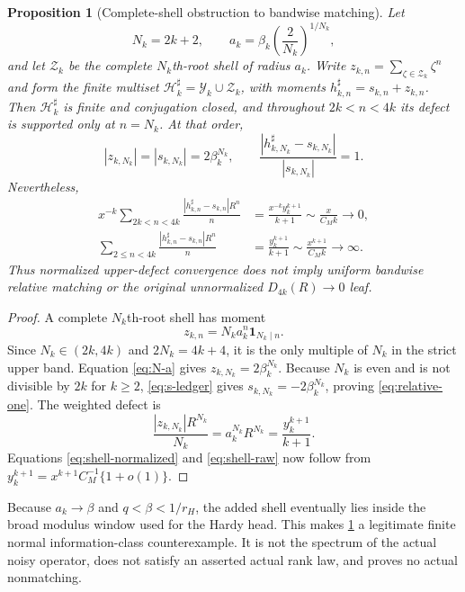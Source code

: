 \documentclass[11pt]{article}
\newtheorem{proposition}[theorem]{Proposition}
\theoremstyle{remark}
\newcommand{\cH}{\mathcal H}
\newcommand{\cY}{\mathcal Y}
\newcommand{\cZ}{\mathcal Z}
\newcommand{\one}{\mathbf 1}
\begin{document}
\begin{proposition}[Complete-shell obstruction to bandwise matching]
\label{prop:shell}
Let
\begin{equation}\label{eq:N-a}
 N_k=2k+2,\qquad
 a_k=\beta_k\left(\frac2{N_k}\right)^{1/N_k},
\end{equation}
and let $\cZ_k$ be the complete $N_k$th-root shell of radius $a_k$.
Write $z_{k,n}=\sum_{\zeta\in\cZ_k}\zeta^n$ and form the finite multiset
$\cH_k^\sharp=\cY_k\cup\cZ_k$, with moments
$h_{k,n}^\sharp=s_{k,n}+z_{k,n}$.  Then $\cH_k^\sharp$ is finite and
conjugation closed, and throughout $2k<n<4k$ its defect is supported only at
$n=N_k$.  At that order,
\begin{equation}\label{eq:relative-one}
 |z_{k,N_k}|=|s_{k,N_k}|=2\beta_k^{N_k},
 \qquad
 \frac{|h_{k,N_k}^\sharp-s_{k,N_k}|}{|s_{k,N_k}|}=1.
\end{equation}
Nevertheless,
\begin{align}
 x^{-k}\sum_{2k<n<4k}
 \frac{|h_{k,n}^\sharp-s_{k,n}|R^n}{n}
 &=\frac{x^{-k}y_k^{k+1}}{k+1}
 \sim\frac{x}{C_Mk}\longrightarrow0,
 \label{eq:shell-normalized}\\
 \sum_{2\le n<4k}
 \frac{|h_{k,n}^\sharp-s_{k,n}|R^n}{n}
 &=\frac{y_k^{k+1}}{k+1}
 \sim\frac{x^{k+1}}{C_Mk}\longrightarrow\infty.
 \label{eq:shell-raw}
\end{align}
Thus normalized upper-defect convergence does not imply uniform bandwise
relative matching or the original unnormalized $D_{4k}(R)\to0$ leaf.
\end{proposition}

\begin{proof}
A complete $N_k$th-root shell has moment
\[
 z_{k,n}=N_ka_k^n\one_{N_k\mid n}.
\]
Since $N_k\in(2k,4k)$ and $2N_k=4k+4$, it is the only multiple of $N_k$
in the strict upper band.  Equation \eqref{eq:N-a} gives
$z_{k,N_k}=2\beta_k^{N_k}$.  Because $N_k$ is even and is not divisible by
$2k$ for $k\ge2$, \eqref{eq:s-ledger} gives
$s_{k,N_k}=-2\beta_k^{N_k}$, proving \eqref{eq:relative-one}.
The weighted defect is
\[
 \frac{|z_{k,N_k}|R^{N_k}}{N_k}
 =a_k^{N_k}R^{N_k}=\frac{y_k^{k+1}}{k+1}.
\]
Equations \eqref{eq:shell-normalized} and \eqref{eq:shell-raw} now follow
from $y_k^{k+1}=x^{k+1}C_M^{-1}\{1+o(1)\}$.
\end{proof}

Because $a_k\to\beta$ and $q<\beta<1/r_H$, the added shell eventually lies
inside the broad modulus window used for the Hardy head.  This makes
\cref{prop:shell} a legitimate finite normal information-class
counterexample.  It is not the spectrum of the actual noisy operator, does
not satisfy an asserted actual rank law, and proves no actual nonmatching.
\end{document}
